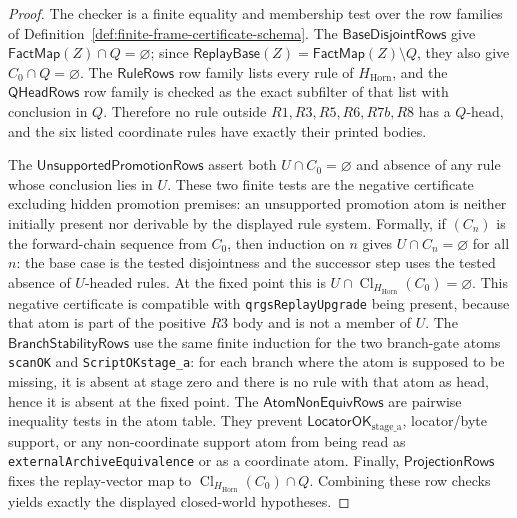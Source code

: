 \documentclass[runningheads]{llncs}
\newcommand{\LocatorOKstageA}{\mathsf{LocatorOK}_{\mathrm{stage\_a}}}
\newcommand{\FactMap}{\mathsf{FactMap}}
\newcommand{\ReplayBase}{\mathsf{ReplayBase}}
\newcommand{\HHorn}{H_{\mathrm{Horn}}}
\newcommand{\ClHHorn}{\operatorname{Cl}_{\HHorn}}
\begin{document}
\begin{proof}
The checker is a finite equality and membership test over the row families of
Definition~\ref{def:finite-frame-certificate-schema}.  The
\(\mathsf{BaseDisjointRows}\) give
\(\FactMap(Z)\cap Q=\varnothing\); since
\(\ReplayBase(Z)=\FactMap(Z)\setminus Q\), they also give \(C_0\cap Q=\varnothing\).
The \(\mathsf{RuleRows}\) row family lists every rule of \(\HHorn\), and the
\(\mathsf{QHeadRows}\) row family is checked as the exact subfilter of that list
with conclusion in \(Q\).  Therefore no rule outside
\(R1,R3,R5,R6,R7b,R8\) has a \(Q\)-head, and the six listed coordinate rules
have exactly their printed bodies.

The \(\mathsf{UnsupportedPromotionRows}\) assert both
\(U\cap C_0=\varnothing\) and absence of any rule whose conclusion lies in
\(U\).  These two finite tests are the negative certificate excluding hidden
promotion premises: an unsupported promotion atom is neither initially present
nor derivable by the displayed rule system.  Formally, if
\((C_n)\) is the forward-chain sequence from \(C_0\), then induction on \(n\)
gives \(U\cap C_n=\varnothing\) for all \(n\): the base case is the tested
disjointness and the successor step uses the tested absence of \(U\)-headed
rules.  At the fixed point this is \(U\cap\ClHHorn(C_0)=\varnothing\).  This
negative certificate is compatible with \texttt{qrgsReplayUpgrade} being present,
because that atom is part of the positive \(R3\) body and is not a member of
\(U\).  The
\(\mathsf{BranchStabilityRows}\) use the same finite induction for the two
branch-gate atoms \texttt{scanOK} and \texttt{ScriptOKstage\_a}: for each branch
where the atom is supposed to be missing, it is absent at stage zero and there
is no rule with that atom as head, hence it is absent at the fixed point.  The
\(\mathsf{AtomNonEquivRows}\) are pairwise inequality tests in the atom table.
They prevent \(\LocatorOKstageA\), locator/byte support, or any non-coordinate
support atom from being read as
\texttt{externalArchiveEquivalence} or as a coordinate atom.  Finally,
\(\mathsf{ProjectionRows}\) fixes the replay-vector map to
\(\ClHHorn(C_0)\cap Q\).  Combining these row checks yields exactly the displayed
closed-world hypotheses.
\end{proof}
\end{document}
